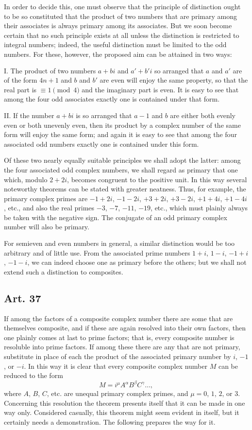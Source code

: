 \documentclass[12pt]{article}
\newcommand{\art}[1]{\subsection*{Art. #1}}
\begin{document}
In order to decide this, one must observe that the principle of distinction ought to be so constituted that the product of two numbers that are primary among their associates is always primary among its associates. But we soon become certain that no such principle exists at all unless the distinction is restricted to integral numbers; indeed, the useful distinction must be limited to the odd numbers. For these, however, the proposed aim can be attained in two ways:

I. The product of two numbers $a+bi$ and $a'+b'i$ so arranged that $a$ and $a'$ are of the form $4n+1$ and $b$ and $b'$ are even will enjoy the same property, so that the real part is $\equiv 1 \pmod{4}$ and the imaginary part is even. It is easy to see that among the four odd associates exactly one is contained under that form.

II. If the number $a+bi$ is so arranged that $a-1$ and $b$ are either both evenly even or both unevenly even, then its product by a complex number of the same form will enjoy the same form; and again it is easy to see that among the four associated odd numbers exactly one is contained under this form.

Of these two nearly equally suitable principles we shall adopt the latter: among the four associated odd complex numbers, we shall regard as primary that one which, modulo $2+2i$, becomes congruent to the positive unit. In this way several noteworthy theorems can be stated with greater neatness. Thus, for example, the primary complex primes are $-1+2i$, $-1-2i$, $+3+2i$, $+3-2i$, $+1+4i$, $+1-4i$, etc., and also the real primes $-3$, $-7$, $-11$, $-19$, etc., which must plainly always be taken with the negative sign. The conjugate of an odd primary complex number will also be primary.

For semieven and even numbers in general, a similar distinction would be too arbitrary and of little use. From the associated prime numbers $1+i$, $1-i$, $-1+i$, $-1-i$, we can indeed choose one as primary before the others; but we shall not extend such a distinction to composites.

\art{37}

If among the factors of a composite complex number there are some that are themselves composite, and if these are again resolved into their own factors, then one plainly comes at last to prime factors; that is, every composite number is resoluble into prime factors. If among these there are any that are not primary, substitute in place of each the product of the associated primary number by $i$, $-1$, or $-i$. In this way it is clear that every composite complex number $M$ can be reduced to the form
\[
M=i^{\mu}A^{\alpha}B^{\beta}C^{\gamma}\ldots,
\]
where $A$, $B$, $C$, etc. are unequal primary complex primes, and $\mu=0$, $1$, $2$, or $3$. Concerning this resolution the theorem presents itself that it can be made in one way only. Considered casually, this theorem might seem evident in itself, but it certainly needs a demonstration. The following prepares the way for it.
\end{document}
